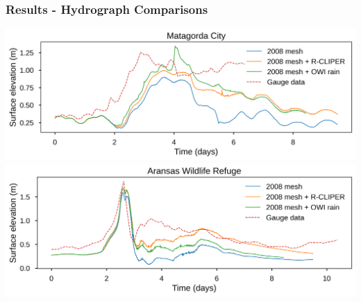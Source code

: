 \documentclass[10pt]{oden_beamer}
\begin{document}
\begin{frame}
  \frametitle{Results - Hydrograph Comparisons}
  \centering
  \includegraphics[width=0.9\linewidth]{matagorda.png}
  \centering
  \includegraphics[width=0.9\linewidth]{aransas_wildlife.png}
\end{frame}
\end{document}
